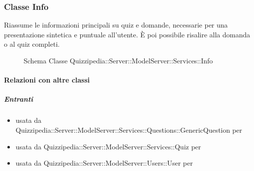 \subsubsection{Classe Info}
Riassume le informazioni principali su quiz e domande, necessarie per una presentazione sintetica e puntuale all'utente. È poi possibile risalire alla domanda o al quiz completi.
\begin{figure}[H]
\centering
\noindent{}
\caption[Schema Classe Info]{Schema Classe Quizzipedia::Server::ModelServer::Services::Info}
\end{figure}
\paragraph{Relazioni con altre classi}
\subparagraph{Entranti}
\begin{itemize}
\item usata da Quizzipedia::Server::ModelServer::Services::Questions::GenericQuestion per 
\item usata da Quizzipedia::Server::ModelServer::Services::Quiz per 
\item usata da Quizzipedia::Server::ModelServer::Users::User per 
\end{itemize}
